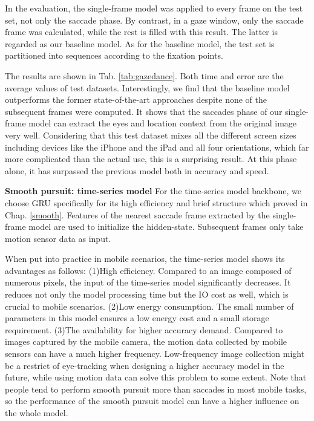 \documentclass[acmlarge]{acmart}
\begin{document}
In the evaluation, the single-frame model was applied to every frame on the test set, not only the saccade phase. By contrast, in a gaze window, only the saccade frame was calculated, while the rest is filled with this result. The latter is regarded as our baseline model. As for the baseline model, the test set is partitioned into sequences according to the fixation points.

The results are shown in Tab. \ref{tab:gazedance}. Both time and error are the average values of test datasets. Interestingly, we find that the baseline model outperforms the former state-of-the-art approaches despite none of the subsequent frames were computed. It shows that the saccades phase of our single-frame model can extract the eyes and location context from the original image very well. Considering that this test dataset mixes all the different screen sizes including devices like the iPhone and the iPad and all four orientations, which far more complicated than the actual use, this is a surprising result. At this phase alone, it has surpassed the previous model both in accuracy and speed. 

\textbf{Smooth pursuit: time-series model}
For the time-series model backbone, we choose GRU specifically for its high efficiency and brief structure which proved in Chap. \ref{smooth}. Features of the nearest saccade frame extracted by the single-frame model are used to initialize the hidden-state. Subsequent frames only take motion sensor data as input.

When put into practice in mobile scenarios, the time-series model shows its advantages as follows: (1)High efficiency. Compared to an image composed of numerous pixels, the input of the time-series model significantly decreases. It reduces not only the model processing time but the IO cost as well, which is crucial to mobile scenarios. (2)Low energy consumption. The small number of parameters in this model ensures a low energy cost and a small storage requirement. (3)The availability for higher accuracy demand. Compared to images captured by the mobile camera, the motion data collected by mobile sensors can have a much higher frequency. Low-frequency image collection might be a restrict of eye-tracking when designing a higher accuracy model in the future, while using motion data can solve this problem to some extent. Note that people tend to perform smooth pursuit more than saccades in most mobile tasks, so the performance of the smooth pursuit model can have a higher influence on the whole model. 
\end{document}
